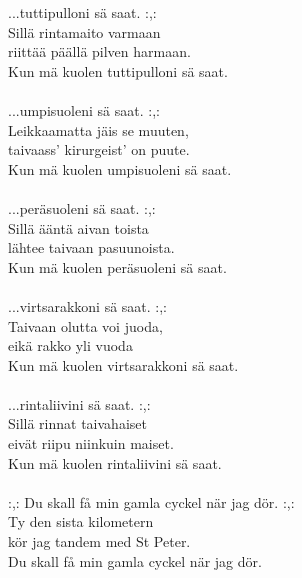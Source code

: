             ...tuttipulloni sä saat. :,: \\
            Sillä rintamaito varmaan \\
            riittää päällä pilven harmaan. \\
            Kun mä kuolen tuttipulloni sä saat. \\
\hspace{10mm} \\
            ...umpisuoleni sä saat. :,: \\
            Leikkaamatta jäis se muuten, \\
            taivaass’ kirurgeist’ on puute. \\
            Kun mä kuolen umpisuoleni sä saat. \\
\hspace{10mm} \\
            ...peräsuoleni sä saat. :,: \\
            Sillä ääntä aivan toista \\
            lähtee taivaan pasuunoista. \\
            Kun mä kuolen peräsuoleni sä saat. \\
\hspace{10mm} \\
            ...virtsarakkoni sä saat. :,: \\
            Taivaan olutta voi juoda, \\
            eikä rakko yli vuoda \\
            Kun mä kuolen virtsarakkoni sä saat. \\
\hspace{10mm} \\
            ...rintaliivini sä saat. :,: \\
            Sillä rinnat taivahaiset \\
            eivät riipu niinkuin maiset. \\
            Kun mä kuolen rintaliivini sä saat. \\
\hspace{10mm} \\
            :,: Du skall få min gamla cyckel när jag dör. :,: \\
            Ty den sista kilometern \\
            kör jag tandem med St Peter. \\
            Du skall få min gamla cyckel när jag dör. \\
\hspace{10mm} \\

